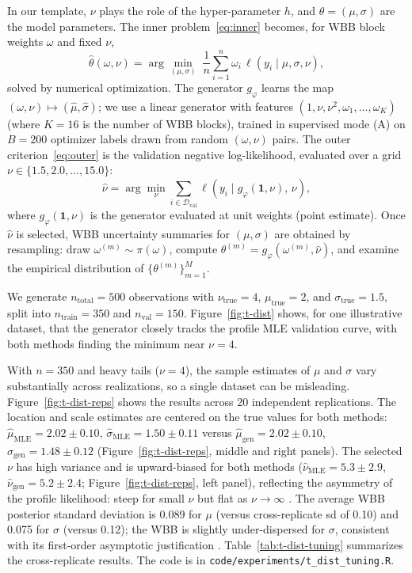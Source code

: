 \documentclass[12pt]{article}
\begin{document}
In our template, $\nu$ plays the role of the hyper-parameter $h$, and $\theta = (\mu,\sigma)$ are the model parameters. The inner problem~\eqref{eq:inner} becomes, for WBB block weights $\omega$ and fixed $\nu$,
\[
\hat\theta(\omega,\nu) = \arg\min_{(\mu,\sigma)}\; \frac{1}{n}\sum_{i=1}^n \omega_i\,\ell(y_i \mid \mu,\sigma,\nu),
\]
solved by numerical optimization. The generator $g_\varphi$ learns the map $(\omega,\nu)\mapsto (\hat\mu, \hat\sigma)$; we use a linear generator with features $(1,\nu,\nu^2,\omega_1,\ldots,\omega_K)$ (where $K=16$ is the number of WBB blocks), trained in supervised mode (A) on $B=200$ optimizer labels drawn from random $(\omega,\nu)$ pairs. The outer criterion~\eqref{eq:outer} is the validation negative log-likelihood, evaluated over a grid $\nu\in\{1.5, 2.0,\ldots, 15.0\}$:
\[
\hat\nu = \arg\min_\nu \sum_{i\in\mathcal{D}_{\mathrm{val}}} \ell\!\left(y_i \mid g_\varphi(\mathbf{1},\nu),\, \nu\right),
\]
where $g_\varphi(\mathbf{1},\nu)$ is the generator evaluated at unit weights (point estimate). Once $\hat\nu$ is selected, WBB uncertainty summaries for $(\mu,\sigma)$ are obtained by resampling: draw $\omega^{(m)}\sim\pi(\omega)$, compute $\theta^{(m)} = g_\varphi(\omega^{(m)},\hat\nu)$, and examine the empirical distribution of $\{\theta^{(m)}\}_{m=1}^M$.

We generate $n_{\mathrm{total}}=500$ observations with $\nu_{\mathrm{true}}=4$, $\mu_{\mathrm{true}}=2$, and $\sigma_{\mathrm{true}}=1.5$, split into $n_{\mathrm{train}}=350$ and $n_{\mathrm{val}}=150$. Figure~\ref{fig:t-dist} shows, for one illustrative dataset, that the generator closely tracks the profile MLE validation curve, with both methods finding the minimum near $\nu=4$.

With $n=350$ and heavy tails ($\nu=4$), the sample estimates of $\mu$ and $\sigma$ vary substantially across realizations, so a single dataset can be misleading. Figure~\ref{fig:t-dist-reps} shows the results across 20 independent replications. The location and scale estimates are centered on the true values for both methods: $\hat\mu_{\mathrm{MLE}} = 2.02\pm 0.10$, $\hat\sigma_{\mathrm{MLE}} = 1.50\pm 0.11$ versus $\hat\mu_{\mathrm{gen}} = 2.02\pm 0.10$, $\hat\sigma_{\mathrm{gen}} = 1.48\pm 0.12$ (Figure~\ref{fig:t-dist-reps}, middle and right panels). The selected $\nu$ has high variance and is upward-biased for both methods ($\hat\nu_{\mathrm{MLE}} = 5.3\pm 2.9$, $\hat\nu_{\mathrm{gen}} = 5.2\pm 2.4$; Figure~\ref{fig:t-dist-reps}, left panel), reflecting the asymmetry of the profile likelihood: steep for small $\nu$ but flat as $\nu\to\infty$ \citep{fonseca2008objective}. The average WBB posterior standard deviation is 0.089 for $\mu$ (versus cross-replicate sd of 0.10) and 0.075 for $\sigma$ (versus 0.12); the WBB is slightly under-dispersed for $\sigma$, consistent with its first-order asymptotic justification \citep{newton2021weighted}. Table~\ref{tab:t-dist-tuning} summarizes the cross-replicate results. The code is in \texttt{code/experiments/t\_dist\_tuning.R}.
\end{document}
